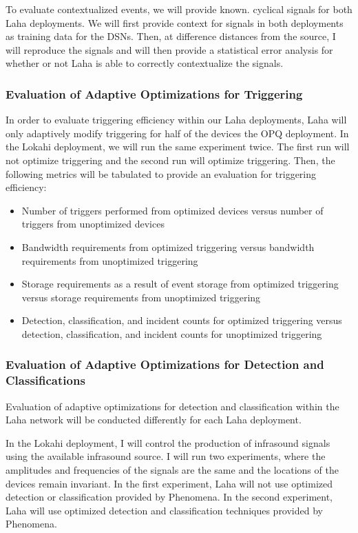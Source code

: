 To evaluate contextualized events, we will provide known. cyclical signals for both Laha deployments. We will first provide context for signals in both deployments as training data for the DSNs. Then, at difference distances from the source, I will reproduce the signals and will then provide a statistical error analysis for whether or not Laha is able to correctly contextualize the signals.

\subsubsection{Evaluation of Adaptive Optimizations for Triggering}
In order to evaluate triggering efficiency within our Laha deployments, Laha will only adaptively modify triggering for half of the devices the OPQ deployment. In the Lokahi deployment, we will run the same experiment twice. The first run will not optimize triggering and the second run will optimize triggering. Then, the following metrics will be tabulated to provide an evaluation for triggering efficiency:

\begin{itemize}
	\item Number of triggers performed from optimized devices versus number of triggers from  unoptimized devices
	\item Bandwidth requirements from optimized triggering versus bandwidth requirements from unoptimized triggering
	\item Storage requirements as a result of event storage from optimized triggering versus storage requirements from unoptimized triggering
	\item Detection, classification, and incident counts for optimized triggering versus detection, classification, and incident counts for unoptimized triggering
\end{itemize}

\subsubsection{Evaluation of Adaptive Optimizations for Detection and Classifications}
Evaluation of adaptive optimizations for detection and classification within the Laha network will be conducted differently for each Laha deployment.

In the Lokahi deployment, I will control the production of infrasound signals using the available infrasound source. I will run two experiments, where the amplitudes and frequencies of the signals are the same and the locations of the devices remain invariant. In the first experiment, Laha will not use optimized detection or classification provided by Phenomena. In the second experiment, Laha will use optimized detection and classification techniques provided by Phenomena. 

